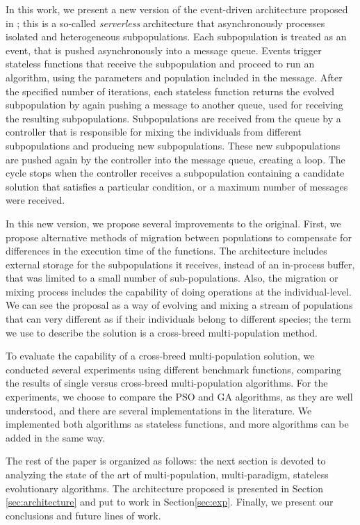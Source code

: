 \documentclass[runningheads]{llncs}
\begin{document}
In this work, we present a new version of the event-driven architecture proposed
in \cite{Guerv2018}; this is a so-called {\em serverless} architecture that
asynchronously processes isolated and heterogeneous subpopulations. Each
subpopulation is treated as an event, that is pushed asynchronously into a
message queue. Events trigger stateless functions that receive the subpopulation
and proceed to run an algorithm, using the parameters and population included in
the message. After the specified number of iterations, each stateless function
returns the evolved subpopulation by again pushing a message to another queue,
used for receiving the resulting subpopulations. Subpopulations are received
from the queue by a controller that is responsible for mixing the individuals
from different subpopulations and producing new subpopulations. These new
subpopulations are pushed again by the controller into the message queue,
creating a loop. The cycle stops when the controller receives a subpopulation
containing a candidate solution that satisfies a particular condition, or a
maximum number of messages were received. 

In this new version, we propose several improvements to the original. First, we
propose alternative methods of migration between populations to compensate for
differences in the execution time of the functions. The architecture includes
external storage for the subpopulations it receives, instead of an in-process
buffer, that was limited to a small number of sub-populations. Also, the
migration or mixing process includes the capability of doing operations at the
individual-level. 
We can see the proposal as a way of evolving and mixing a
stream of populations that can very different as if their individuals belong to
different species; the term we use to describe the solution is a cross-breed
multi-population method.

To evaluate the capability of a cross-breed multi-population solution,
we conducted several experiments using different benchmark functions, comparing the
results of single versus cross-breed multi-population algorithms. For the experiments, we choose to
compare the PSO and GA algorithms, as they are well understood, and there are
several implementations in the literature. We implemented both algorithms as
stateless functions, and more algorithms can be added in the same way.

The rest of the paper is organized as follows: the next section is devoted
to analyzing the state of the art of multi-population, multi-paradigm,
stateless evolutionary algorithms. The architecture proposed is
presented in Section \ref{sec:architecture} and put to work in Section\ref{sec:exp}.
Finally, we present our conclusions and future lines of work.
\end{document}
